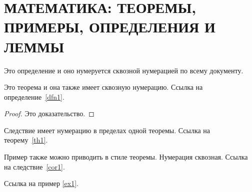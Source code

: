 \section{МАТЕМАТИКА: ТЕОРЕМЫ, ПРИМЕРЫ, ОПРЕДЕЛЕНИЯ И ЛЕММЫ}

\begin{definition}\label{dfn1}
    Это определение и оно нумеруется сквозной нумерацией по всему документу.
\end{definition}

\begin{theorem}\label{th1}
    Это теорема и она также имеет сквозную нумерацию. Ссылка на определение~\ref{dfn1}.
\end{theorem}

\begin{proof}
    Это доказательство.
\end{proof}

\begin{corollary}\label{cor1}
    Следствие имеет нумерацию в пределах одной теоремы. Ссылка на теорему~\ref{th1}.
\end{corollary}

\begin{example}\label{ex1}
    Пример также можно приводить в стиле теоремы. Нумерация сквозная. Ссылка на следствие~\ref{cor1}.
\end{example}

Ссылка на пример \ref{ex1}.